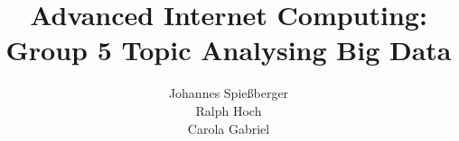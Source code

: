 \documentclass{sig-alternate}
\begin{document}
%

\title{Advanced Internet Computing: Group 5 Topic Analysing Big Data}
%
%
%
%
%

%
\author{
%
%
\alignauthor
Johannes Spie{\ss}berger\\
\alignauthor
Ralph Hoch\\
\alignauthor 
Carola Gabriel\\
}
\end{document}
